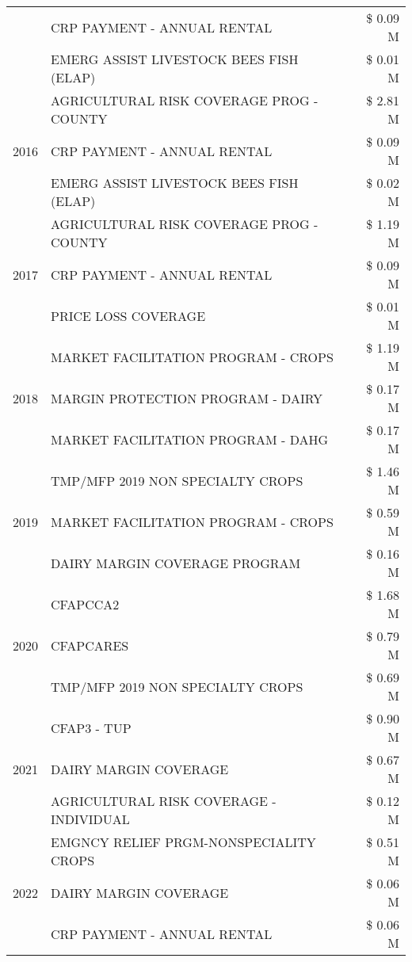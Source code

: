 \begin{tabular}{llr}
 & CRP PAYMENT - ANNUAL RENTAL & \$ 0.09 M \\
 & EMERG ASSIST LIVESTOCK BEES FISH (ELAP) & \$ 0.01 M \\
\cline{1-3}
\multirow[t]{3}{*}{2016} & AGRICULTURAL RISK COVERAGE PROG - COUNTY & \$ 2.81 M \\
 & CRP PAYMENT - ANNUAL RENTAL & \$ 0.09 M \\
 & EMERG ASSIST LIVESTOCK BEES FISH (ELAP) & \$ 0.02 M \\
\cline{1-3}
\multirow[t]{3}{*}{2017} & AGRICULTURAL RISK COVERAGE PROG - COUNTY & \$ 1.19 M \\
 & CRP PAYMENT - ANNUAL RENTAL & \$ 0.09 M \\
 & PRICE LOSS COVERAGE & \$ 0.01 M \\
\cline{1-3}
\multirow[t]{3}{*}{2018} & MARKET FACILITATION PROGRAM - CROPS & \$ 1.19 M \\
 & MARGIN PROTECTION PROGRAM - DAIRY & \$ 0.17 M \\
 & MARKET FACILITATION PROGRAM - DAHG & \$ 0.17 M \\
\cline{1-3}
\multirow[t]{3}{*}{2019} & TMP/MFP 2019 NON SPECIALTY CROPS & \$ 1.46 M \\
 & MARKET FACILITATION PROGRAM - CROPS & \$ 0.59 M \\
 & DAIRY MARGIN COVERAGE PROGRAM & \$ 0.16 M \\
\cline{1-3}
\multirow[t]{3}{*}{2020} & CFAPCCA2 & \$ 1.68 M \\
 & CFAPCARES & \$ 0.79 M \\
 & TMP/MFP 2019 NON SPECIALTY CROPS & \$ 0.69 M \\
\cline{1-3}
\multirow[t]{3}{*}{2021} & CFAP3 - TUP & \$ 0.90 M \\
 & DAIRY MARGIN COVERAGE & \$ 0.67 M \\
 & AGRICULTURAL RISK COVERAGE - INDIVIDUAL & \$ 0.12 M \\
\cline{1-3}
\multirow[t]{3}{*}{2022} & EMGNCY RELIEF PRGM-NONSPECIALITY CROPS & \$ 0.51 M \\
 & DAIRY MARGIN COVERAGE & \$ 0.06 M \\
 & CRP PAYMENT - ANNUAL RENTAL & \$ 0.06 M \\
\cline{1-3}
\bottomrule
\end{tabular}
